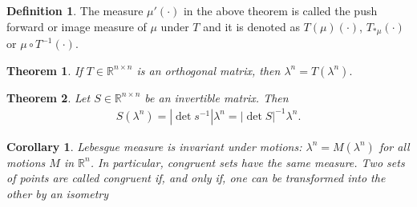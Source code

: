 \documentclass{article}
\newtheorem{theorem}{Theorem}[section]
\newtheorem{corollary}{Corollary}[theorem]
\theoremstyle{definition}
\newtheorem{definition}{Definition}[theorem]
\begin{document}
    \begin{definition}
        The measure $\mu'(\cdot)$ in the above theorem is called the push forward or image measure of $\mu$ under $T$ and it is denoted as 
        $T(\mu)(\cdot)$, $T_{*\mu}(\cdot)$ or $\mu\circ T^{-1}(\cdot)$.
    \end{definition}

    \begin{theorem}
        If $T\in \mathbb R^{n\times n} $ is an orthogonal matrix, then $\lambda^n = T(\lambda^n).$
    \end{theorem}

    \begin{theorem}
        Let $S\in\mathbb R^{n\times n}$ be an invertible matrix. Then 
        \begin{align}
        S(\lambda^n) = |\det s^{-1}|\lambda^n = |\det S|^{-1}\lambda^n.    
        \end{align}
    \end{theorem}

    \begin{corollary}
        Lebesgue measure is invariant under motions: $\lambda^n=M(\lambda^n)$ for all motions $M$ in $\mathbb R^n$. In particular, congruent sets have the same measure. Two sets of points are called congruent if, and only if, one can be transformed into the other by an isometry
    \end{corollary}
\end{document}
